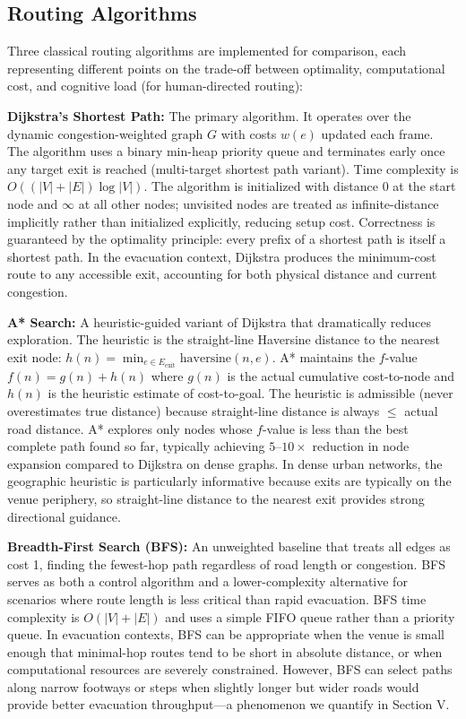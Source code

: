\documentclass[conference]{IEEEtran}
\begin{document}
\subsection{Routing Algorithms}

Three classical routing algorithms are implemented for comparison, each representing different points on the trade-off between optimality, computational cost, and cognitive load (for human-directed routing):

\textbf{Dijkstra's Shortest Path:} The primary algorithm. It operates over the dynamic congestion-weighted graph $G$ with costs $w(e)$ updated each frame. The algorithm uses a binary min-heap priority queue and terminates early once any target exit is reached (multi-target shortest path variant). Time complexity is $O((|V| + |E|) \log |V|)$. The algorithm is initialized with distance 0 at the start node and $\infty$ at all other nodes; unvisited nodes are treated as infinite-distance implicitly rather than initialized explicitly, reducing setup cost. Correctness is guaranteed by the optimality principle: every prefix of a shortest path is itself a shortest path. In the evacuation context, Dijkstra produces the minimum-cost route to any accessible exit, accounting for both physical distance and current congestion.

\textbf{A* Search:} A heuristic-guided variant of Dijkstra that dramatically reduces exploration. The heuristic is the straight-line Haversine distance to the nearest exit node: $h(n) = \min_{e \in E_{\text{exit}}} \text{haversine}(n, e)$. A* maintains the $f$-value $f(n) = g(n) + h(n)$ where $g(n)$ is the actual cumulative cost-to-node and $h(n)$ is the heuristic estimate of cost-to-goal. The heuristic is admissible (never overestimates true distance) because straight-line distance is always $\leq$ actual road distance. A* explores only nodes whose $f$-value is less than the best complete path found so far, typically achieving $5$–$10\times$ reduction in node expansion compared to Dijkstra on dense graphs. In dense urban networks, the geographic heuristic is particularly informative because exits are typically on the venue periphery, so straight-line distance to the nearest exit provides strong directional guidance.

\textbf{Breadth-First Search (BFS):} An unweighted baseline that treats all edges as cost 1, finding the fewest-hop path regardless of road length or congestion. BFS serves as both a control algorithm and a lower-complexity alternative for scenarios where route length is less critical than rapid evacuation. BFS time complexity is $O(|V| + |E|)$ and uses a simple FIFO queue rather than a priority queue. In evacuation contexts, BFS can be appropriate when the venue is small enough that minimal-hop routes tend to be short in absolute distance, or when computational resources are severely constrained. However, BFS can select paths along narrow footways or steps when slightly longer but wider roads would provide better evacuation throughput—a phenomenon we quantify in Section V.
\end{document}
